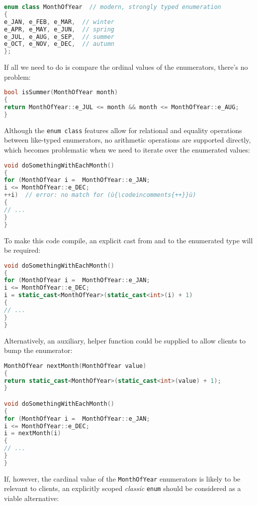 \begin{lstlisting}[language=C++]
enum class MonthOfYear  // modern, strongly typed enumeration
{
e_JAN, e_FEB, e_MAR,  // winter
e_APR, e_MAY, e_JUN,  // spring
e_JUL, e_AUG, e_SEP,  // summer
e_OCT, e_NOV, e_DEC,  // autumn
};
\end{lstlisting}

\noindent If all we need to do is compare the ordinal values of the enumerators,
there's no problem:

\begin{lstlisting}[language=C++]
bool isSummer(MonthOfYear month)
{
return MonthOfYear::e_JUL <= month && month <= MonthOfYear::e_AUG;
}
\end{lstlisting}

\noindent Although the \texttt{enum}~\texttt{class} features allow for relational
and equality operations between like-typed enumerators, no arithmetic
operations are supported directly, which becomes problematic when we
need to iterate over the enumerated values:

\begin{lstlisting}[language=C++]
void doSomethingWithEachMonth()
{
for (MonthOfYear i =  MonthOfYear::e_JAN;
i <= MonthOfYear::e_DEC;
++i)  // error: no match for (ù{\codeincomments{++}}ù)
{
// ...
}
}
\end{lstlisting}

\noindent To make this code compile, an explicit cast from and to the enumerated
type will be required:

\begin{lstlisting}[language=C++]
void doSomethingWithEachMonth()
{
for (MonthOfYear i =  MonthOfYear::e_JAN;
i <= MonthOfYear::e_DEC;
i = static_cast<MonthOfYear>(static_cast<int>(i) + 1)
{
// ...
}
}
\end{lstlisting}

\noindent Alternatively, an auxiliary, helper function could be supplied to allow
clients to bump the enumerator:

\begin{lstlisting}[language=C++]
MonthOfYear nextMonth(MonthOfYear value)
{
return static_cast<MonthOfYear>(static_cast<int>(value) + 1);
}

void doSomethingWithEachMonth()
{
for (MonthOfYear i =  MonthOfYear::e_JAN;
i <= MonthOfYear::e_DEC;
i = nextMonth(i)
{
// ...
}
}
\end{lstlisting}

\noindent If, however, the cardinal value of the \texttt{MonthOfYear} enumerators
is likely to be relevant to clients, an explicitly scoped \emph{classic}
\texttt{enum} should be considered as a viable alternative:

